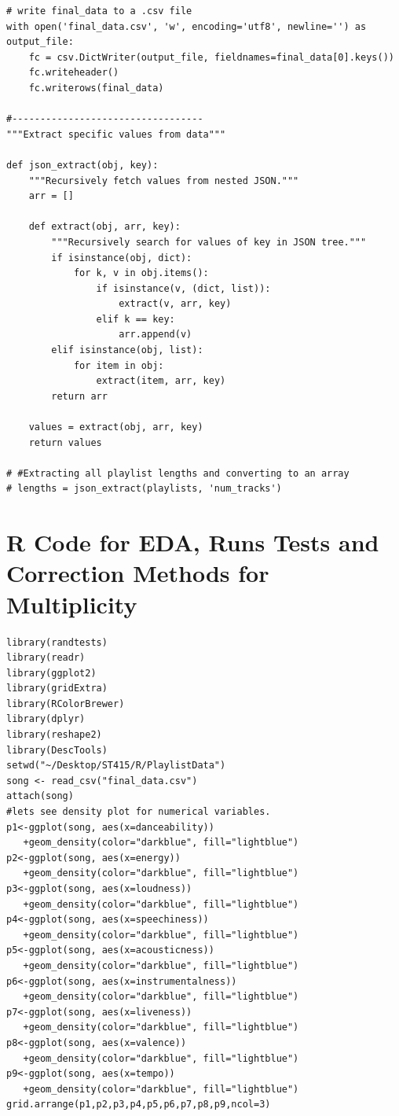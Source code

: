 \documentclass[12pt]{article}
\theoremstyle{plain}
\theoremstyle{definition}
\theoremstyle{remark}
\begin{document}
\begin{appendices}
\begin{verbatim}
# write final_data to a .csv file
with open('final_data.csv', 'w', encoding='utf8', newline='') as output_file:
    fc = csv.DictWriter(output_file, fieldnames=final_data[0].keys())
    fc.writeheader()
    fc.writerows(final_data)

#----------------------------------
"""Extract specific values from data"""

def json_extract(obj, key):
    """Recursively fetch values from nested JSON."""
    arr = []

    def extract(obj, arr, key):
        """Recursively search for values of key in JSON tree."""
        if isinstance(obj, dict):
            for k, v in obj.items():
                if isinstance(v, (dict, list)):
                    extract(v, arr, key)
                elif k == key:
                    arr.append(v)
        elif isinstance(obj, list):
            for item in obj:
                extract(item, arr, key)
        return arr

    values = extract(obj, arr, key)
    return values

# #Extracting all playlist lengths and converting to an array
# lengths = json_extract(playlists, 'num_tracks')
\end{verbatim}
\section{R Code for EDA, Runs Tests and Correction Methods for Multiplicity}
\begin{verbatim}
library(randtests)
library(readr)
library(ggplot2)
library(gridExtra)
library(RColorBrewer)
library(dplyr)
library(reshape2)
library(DescTools)
setwd("~/Desktop/ST415/R/PlaylistData")
song <- read_csv("final_data.csv")
attach(song)
#lets see density plot for numerical variables.
p1<-ggplot(song, aes(x=danceability))
   +geom_density(color="darkblue", fill="lightblue")
p2<-ggplot(song, aes(x=energy))
   +geom_density(color="darkblue", fill="lightblue")
p3<-ggplot(song, aes(x=loudness))
   +geom_density(color="darkblue", fill="lightblue")
p4<-ggplot(song, aes(x=speechiness))
   +geom_density(color="darkblue", fill="lightblue")
p5<-ggplot(song, aes(x=acousticness))
   +geom_density(color="darkblue", fill="lightblue")
p6<-ggplot(song, aes(x=instrumentalness))
   +geom_density(color="darkblue", fill="lightblue")
p7<-ggplot(song, aes(x=liveness))
   +geom_density(color="darkblue", fill="lightblue")
p8<-ggplot(song, aes(x=valence))
   +geom_density(color="darkblue", fill="lightblue")
p9<-ggplot(song, aes(x=tempo))
   +geom_density(color="darkblue", fill="lightblue")
grid.arrange(p1,p2,p3,p4,p5,p6,p7,p8,p9,ncol=3)


\end{verbatim}
\end{appendices}
\end{document}
